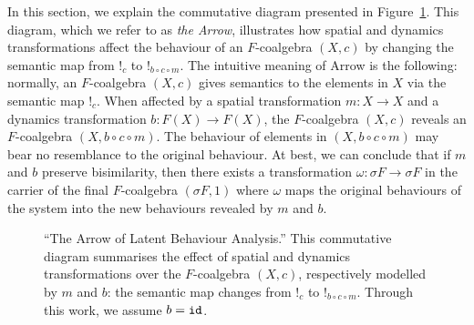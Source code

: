 In this section, we explain the commutative diagram presented in Figure~\ref{fig:TheArrow}. This diagram, which we refer to as \emph{the Arrow}, illustrates how spatial and dynamics transformations affect the behaviour of an $F$-coalgebra $(X,c)$ by changing the semantic map from $!_c$ to $!_{b\circ c\circ m}$. 
The intuitive meaning of Arrow is the following: normally, an $F$-coalgebra $(X,c)$ gives semantics to the elements in $X$ via the semantic map $!_c$. When affected by a spatial transformation $m\colon X\rightarrow X$ and a dynamics transformation $b\colon F(X)\rightarrow F(X)$, the $F$-coalgebra $(X,c)$ reveals an $F$-coalgebra $(X,b\circ c\circ m)$. 
The behaviour of elements in $(X,b\circ c\circ m)$ may bear no resemblance to the original behaviour. At best, we can conclude that if $m$ and $b$ preserve bisimilarity, then there exists a transformation $\omega\colon \sigma F \rightarrow \sigma F$ in the carrier of the final $F$-coalgebra $(\sigma F, 1)$ where $\omega$ maps the original behaviours of the system into the new behaviours revealed by $m$ and $b$. 

\begin{figure}[ht]
        \centering
        \caption{``The Arrow of Latent Behaviour Analysis.'' This commutative diagram summarises the effect of spatial and dynamics transformations over the $F$-coalgebra $(X,c)$, respectively modelled by $m$ and $b$: the semantic map changes from $!_c$ to $!_{b\circ c\circ m}$. Through this work, we assume $b={\texttt{id}}$.}
        \label{fig:TheArrow} 
    \end{figure}

